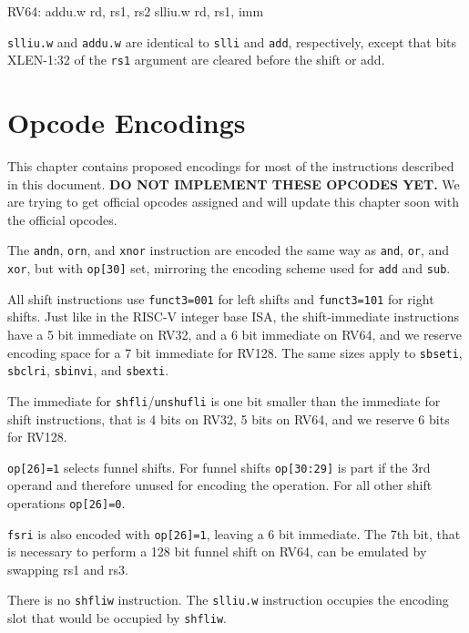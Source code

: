 \begin{rvb}
  RV64:
    addu.w rd, rs1, rs2
    slliu.w rd, rs1, imm
\end{rvb}

{\tt slliu.w} and {\tt addu.w} are identical to {\tt slli} and {\tt add}, respectively,
except that bits XLEN-1:32 of the {\tt rs1} argument are cleared before the shift or add.





\section{Opcode Encodings}
\label{opcodes}

This chapter contains proposed encodings for most of the instructions described
in this document. {\bf DO NOT IMPLEMENT THESE OPCODES YET.} We are trying to get
official opcodes assigned and will update this chapter soon with the official
opcodes.

The {\tt andn}, {\tt orn}, and {\tt xnor} instruction are encoded the same way
as {\tt and}, {\tt or}, and {\tt xor}, but with {\tt op[30]} set, mirroring the
encoding scheme used for {\tt add} and {\tt sub}.

All shift instructions use {\tt funct3=001} for left shifts and {\tt funct3=101}
for right shifts. Just like in the RISC-V integer base ISA, the shift-immediate
instructions have a 5 bit immediate on RV32, and a 6 bit immediate on RV64, and we
reserve encoding space for a 7 bit immediate for RV128.  The same sizes apply
to {\tt sbseti}, {\tt sbclri}, {\tt sbinvi}, and {\tt sbexti}.

The immediate for {\tt shfli}/{\tt unshufli} is one bit smaller than the immediate
for shift instructions, that is 4 bits on RV32, 5 bits on RV64, and we reserve 6
bits for RV128.

{\tt op[26]=1} selects funnel shifts. For funnel shifts {\tt op[30:29]} is part
if the 3rd operand and therefore unused for encoding the operation. For all other
shift operations {\tt op[26]=0}.

{\tt fsri} is also encoded with {\tt op[26]=1}, leaving a 6 bit immediate. The 7th
bit, that is necessary to perform a 128 bit funnel shift on RV64, can be
emulated by swapping rs1 and rs3.

There is no {\tt shfliw} instruction. The {\tt slliu.w} instruction occupies
the encoding slot that would be occupied by {\tt shfliw}.

